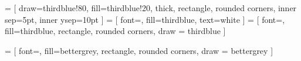  = [   draw=thirdblue!80, 
                    fill=thirdblue!20, 
                    thick,
                    rectangle, 
                    rounded corners, 
                    inner sep=5pt, 
                    inner ysep=10pt
                    ]
 = [  font=\sffamily\large, 
                    fill=thirdblue,
                    text=white
                    ]
 = [  font=\sffamily\large, 
                    fill=thirdblue,
                    rectangle,
                    rounded corners,
                    draw = thirdblue
                    ]


 = [  font=\sffamily\large, 
                    fill=bettergrey,
                    rectangle,
                    rounded corners,
                    draw = bettergrey
                    ]


\newcommand{\ladle}{\protect\texttt{[image: icons/ladle.png]}}
\newcommand{\tweetbird}{\protect\texttt{[image: icons/bird.png]}}
\newcommand{\logbook}{\protect\texttt{[image: icons/logbook.png]}}
\newcommand{\explo}{\protect\texttt{[image: icons/helmet.png]}}
\newcommand{\calc}{\protect\texttt{[image: icons/calc.png]}}
\newcommand{\dig}{\protect\texttt{[image: icons/dig.png]}}
\newcommand{\note}{\raisebox{-1ex}{\protect\texttt{[image: icons/notes.png]}} \qquad}
\newcommand{\enote}{\qquad \raisebox{-1ex}{\protect\texttt{[image: icons/notes2.png]}}}


\newcommand{\pic}[1]{\raisebox{-0.2em}{\protect\texttt{[image: icons/pic.png]}}~\hskip0.15em \emph{#1}\relax}

